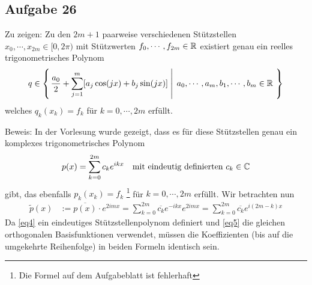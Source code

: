 \subsection*{Aufgabe 26}
Zu zeigen: Zu den $2 m + 1 $ paarweise verschiedenen Stützstellen $x_0 , \cdots , x_{2m} \in [0, 2\pi)$ mit
Stützwerten $f_0 , \cdots , f_{2m} \in \mathbb R$ existiert genau ein reelles trigonometrisches
Polynom
\begin{align}
  q \in \left\lbrace \left. \frac{a_0}{2} + \sum_{j = 1}^m [a_j \cos(j x) + b_j \sin(j x)] \;
    \right| \; a_0 , \cdots , a_m , b_1 , \cdots , b_m \in \mathbb R\  \right\rbrace
\end{align}
welches $q_k(x_k) = f_k$ für $k = 0 , \cdots , 2m$ erfüllt.

Beweis: In der Vorlesung wurde gezeigt, dass es für diese Stützstellen genau ein
komplexes trigonometrisches Polynom
\begin{align}
\label{eq4}
  p(x) = \sum_{k = 0}^{2m} c_k e^{i k x}\quad \text{mit eindeutig definierten }c_k \in \mathbb C
\end{align}
gibt, das ebenfalls $p_k(x_k) = f_k$ \footnote{Die Formel auf dem Aufgabeblatt ist fehlerhaft}
für $k = 0 , \cdots , 2m$ erfüllt. Wir betrachten nun
\begin{align}
\label{eq5}
  \tilde{p}(x) &:= \overline{p(x)} \cdot e^{2 i m x } =
    \sum_{k = 0}^{2m} \overline{c_k} e^{- i k x} e^{2 i m x } =
    \sum_{k = 0}^{2m} \overline{c_k} e^{ i (2m - k) x }
\end{align}
Da \eqref{eq4} ein eindeutiges Stützstellenpolynom definiert und \eqref{eq5} die
gleichen orthogonalen Basisfunktionen verwendet, müssen die Koeffizienten
(bis auf die umgekehrte Reihenfolge) in beiden Formeln identisch sein.

